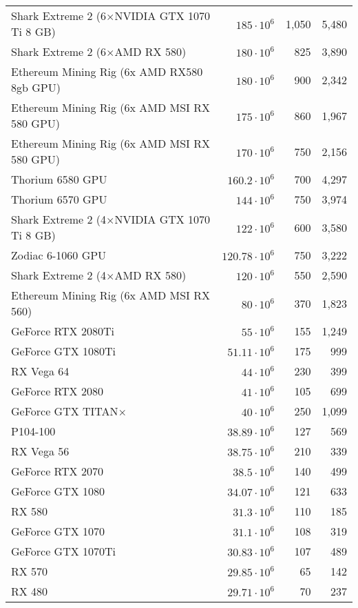 \begin{longtable}{|p{}|r|r|r|}
  Shark Extreme 2 (6$ \times $NVIDIA GTX 1070 Ti 8 GB) & $185 \cdot 10^{6}$ & 1,050 & 5,480 \\
  Shark Extreme 2 (6$ \times $AMD RX 580) & $180 \cdot 10^{6}$ & 825 & 3,890 \\
  Ethereum Mining Rig (6x AMD RX580 8gb GPU) & $180 \cdot 10^{6}$ & 900 & 2,342 \\
  Ethereum Mining Rig (6x AMD MSI RX 580 GPU) & $175 \cdot 10^{6}$ & 860 & 1,967 \\
  Ethereum Mining Rig (6x AMD MSI RX 580 GPU) & $170 \cdot 10^{6}$ & 750 & 2,156 \\
  Thorium 6580 GPU & $160.2 \cdot 10^{6}$ & 700 & 4,297 \\
  Thorium 6570 GPU & $144 \cdot 10^{6}$ & 750 & 3,974 \\
  Shark Extreme 2 (4$ \times $NVIDIA GTX 1070 Ti 8 GB) & $122 \cdot 10^{6}$ & 600 & 3,580 \\
  Zodiac 6-1060 GPU & $120.78 \cdot 10^{6}$ & 750 & 3,222 \\
  Shark Extreme 2 (4$ \times $AMD RX 580) & $120 \cdot 10^{6}$ & 550 & 2,590 \\
  Ethereum Mining Rig (6x AMD MSI RX 560) & $80 \cdot 10^{6}$ & 370 & 1,823 \\
  GeForce RTX 2080Ti & $55 \cdot 10^{6}$ & 155 & 1,249 \\
  GeForce GTX 1080Ti & $51.11 \cdot 10^{6}$ & 175 & 999 \\
  RX Vega 64 & $44 \cdot 10^{6}$ & 230 & 399 \\
  GeForce RTX 2080 & $41 \cdot 10^{6}$ & 105 & 699 \\
  GeForce GTX TITAN$ \times $& $40 \cdot 10^{6}$ & 250 & 1,099 \\
  P104-100 & $38.89 \cdot 10^{6}$ & 127 & 569 \\
  RX Vega 56 & $38.75 \cdot 10^{6}$ & 210 & 339 \\
  GeForce RTX 2070 & $38.5 \cdot 10^{6}$ & 140 & 499 \\
  GeForce GTX 1080 & $34.07 \cdot 10^{6}$ & 121 & 633 \\
  RX 580 & $31.3 \cdot 10^{6}$ & 110 & 185 \\
  GeForce GTX 1070 & $31.1 \cdot 10^{6}$ & 108 & 319 \\
  GeForce GTX 1070Ti & $30.83 \cdot 10^{6}$ & 107 & 489 \\
  RX 570 & $29.85 \cdot 10^{6}$ & 65 & 142 \\
  RX 480 & $29.71 \cdot 10^{6}$ & 70 & 237 \\

\end{longtable}
